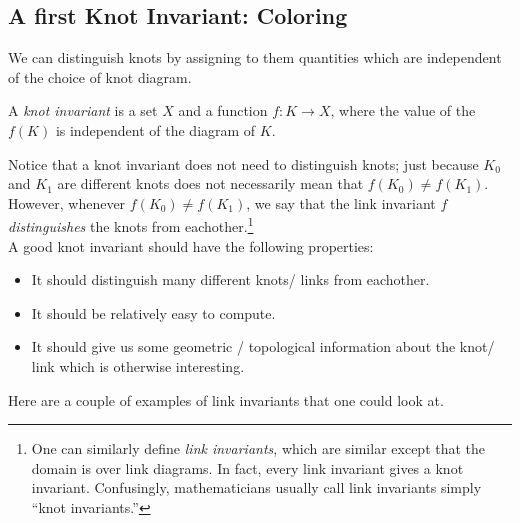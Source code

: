 \subsection{A first Knot Invariant: Coloring}
We can distinguish knots by assigning to them quantities which are independent of the choice of knot diagram. 
\begin{definition} A \emph{knot invariant} is a set $X$ and a function $f:K\to X$, where the value of the $f(K)$ is independent of the diagram of $K$.\end{definition}
Notice that a knot invariant does not need to distinguish knots; just because $K_0$ and $K_1$ are different knots does not necessarily mean that $f(K_0)\neq f(K_1)$. However, whenever $f(K_0)\neq f(K_1)$, we say that the link invariant $f$ \emph{distinguishes} the knots from eachother.\footnote{One can similarly define \emph{link invariants}, which are similar except that the domain is over link diagrams. In fact, every link invariant gives a knot invariant. Confusingly, mathematicians usually call link invariants simply ``knot invariants.'' }\\
 A good knot invariant should have the following properties:
\begin{itemize}
\item It should distinguish many different knots/ links  from eachother.
\item It should be relatively easy to compute.
\item It should give us some geometric / topological information about the knot/ link which is otherwise interesting. 
\end{itemize}
Here are a couple of examples of link invariants that one could look at. \\
